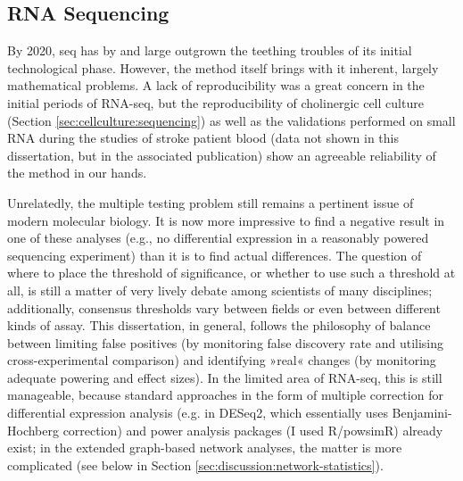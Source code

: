 \subsection{RNA Sequencing} \label{sec:discussion:rna-seq}
By 2020, \ac{seq} has by and large outgrown the teething troubles of its initial technological phase. However, the method itself brings with it inherent, largely mathematical problems. A lack of reproducibility was a great concern in the initial periods of RNA-seq, but the reproducibility of cholinergic cell culture (Section \ref{sec:cellculture:sequencing}) as well as the validations performed on small RNA during the studies of stroke patient blood (data not shown in this dissertation, but in the associated publication\cite{Winek2020}) show an agreeable reliability of the method in our hands.

Unrelatedly, the multiple testing problem still remains a pertinent issue of modern molecular biology. It is now more impressive to find a negative result in one of these analyses (e.g., no differential expression in a reasonably powered sequencing experiment) than it is to find actual differences. The question of where to place the threshold of significance, or whether to use such a threshold at all, is still a matter of very lively debate among scientists of many disciplines; additionally, consensus thresholds vary between fields or even between different kinds of assay. This dissertation, in general, follows the philosophy of balance between limiting false positives (by monitoring false discovery rate and utilising cross-experimental comparison) and identifying »real« changes (by monitoring adequate powering and effect sizes). In the limited area of RNA-seq, this is still manageable, because standard approaches in the form of multiple correction for differential expression analysis (e.g. in DESeq2,\cite{Love2014} which essentially uses Benjamini-Hochberg correction) and power analysis packages (I used R/powsimR\cite{Vieth2017}) already exist; in the extended graph-based network analyses, the matter is more complicated (see below in Section \ref{sec:discussion:network-statistics}).

